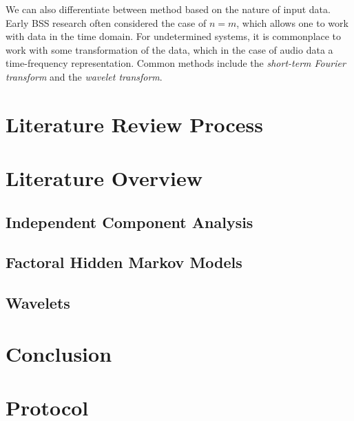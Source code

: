 \documentclass[11pt, oneside, a4paper]{article}
\begin{document}
We can also differentiate between method based on the nature of input data. Early BSS research often considered the case of $n=m$, which allows one to work with data in the time domain. For undetermined systems, it is commonplace to work with some transformation of the data, which in the case of audio data a time-frequency representation. Common methods include the \emph{short-term Fourier transform} and the \emph{wavelet transform}.

\section{Literature Review Process} %



\section{Literature Overview}


\subsection{Independent Component Analysis} %




\subsection{Factoral Hidden Markov Models} %


\subsection{Wavelets} %


\section{Conclusion}

\theappendix

\section{Protocol}


\begin{thebibliography}{99}


  
\end{thebibliography}
\end{document}
